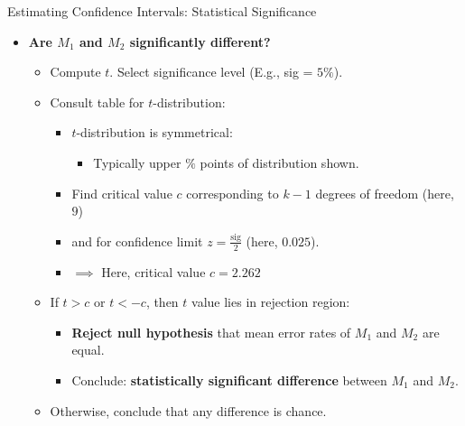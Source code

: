 \begin{frame}{Estimating Confidence Intervals: Statistical Significance}
  \begin{itemize}
  \item \textbf{Are $M_1$ and $M_2$ {\color{airforceblue} significantly different}?}
    \begin{itemize}
    \item Compute $t$. Select significance level (E.g., sig = $5 \%$).
    \item Consult table for $t$-distribution:
      \begin{itemize}
      \item $t$-distribution is symmetrical:
        \begin{itemize}
        \item Typically upper $\%$ points of distribution shown.
        \end{itemize}
      \item Find critical value $c$ corresponding to $k-1$ degrees of freedom (here, $9$)
      \item and for confidence limit $z = \frac{\text{sig}}{2}$ (here, $0.025$).
      \item $\implies$ Here, critical value $c = 2.262$
      \end{itemize}
    \item If $t > c$ or $t < -c$, then $t$ value lies in rejection region:
      \begin{itemize}
      \item \textbf{Reject null hypothesis} that mean error rates of $M_1$ and $M_2$ are equal.
      \item Conclude: \textbf{statistically significant difference} between $M_1$ and $M_2$.
      \end{itemize}
    \item Otherwise, conclude that any difference is chance.
    \end{itemize}
  \end{itemize}
\end{frame}


